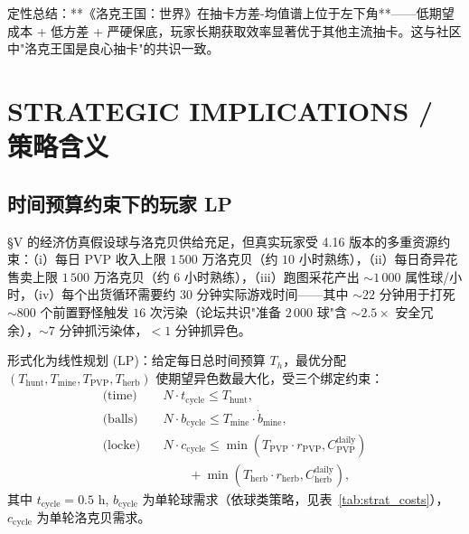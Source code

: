 \documentclass[journal]{IEEEtran}
\begin{document}
定性总结：**《洛克王国：世界》在抽卡方差-均值谱上位于左下角**——低期望成本 + 低方差 + 严硬保底，玩家长期获取效率显著优于其他主流抽卡。这与社区中"洛克王国是良心抽卡"的共识一致。


\section{STRATEGIC IMPLICATIONS / 策略含义}\label{sec:strategy}

\subsection{时间预算约束下的玩家 LP}\label{sec:timelp}

§V 的经济仿真假设球与洛克贝供给充足，但真实玩家受 4.16 版本的多重资源约束：（i）每日 PVP 收入上限 $1\,500$ 万洛克贝（约 $10$ 小时熟练），（ii）每日奇异花售卖上限 $1\,500$ 万洛克贝（约 $6$ 小时熟练），（iii）跑图采花产出 $\sim 1\,000$ 属性球/小时，（iv）每个出货循环需要约 $30$ 分钟实际游戏时间——其中 $\sim 22$ 分钟用于打死 $\sim 800$ 个前置野怪触发 $16$ 次污染（论坛共识"准备 $2\,000$ 球"含 $\sim 2.5\times$ 安全冗余），$\sim 7$ 分钟抓污染体，$<1$ 分钟抓异色。

形式化为线性规划 (LP)：给定每日总时间预算 $T_h$，最优分配 $(T_{\text{hunt}}, T_{\text{mine}}, T_{\text{PVP}}, T_{\text{herb}})$ 使期望异色数最大化，受三个绑定约束：
\begin{align}
\text{(time)}\quad   & N \cdot t_{\text{cycle}} \le T_{\text{hunt}}, \\
\text{(balls)}\quad  & N \cdot b_{\text{cycle}} \le T_{\text{mine}} \cdot \dot b_{\text{mine}}, \\
\text{(locke)}\quad  & N \cdot c_{\text{cycle}} \le \min(T_{\text{PVP}} \cdot r_{\text{PVP}}, C_{\text{PVP}}^{\text{daily}}) \nonumber \\
                     & \qquad + \min(T_{\text{herb}} \cdot r_{\text{herb}}, C_{\text{herb}}^{\text{daily}}),
\end{align}
其中 $t_{\text{cycle}} = 0.5$ h, $b_{\text{cycle}}$ 为单轮球需求（依球类策略，见表~\ref{tab:strat_costs}），$c_{\text{cycle}}$ 为单轮洛克贝需求。
\end{document}
